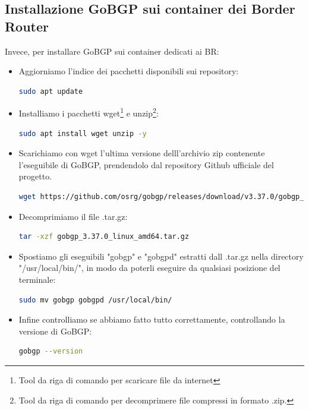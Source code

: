 \documentclass[12pt,a4paper,twoside]{book}
\begin{document}
\subsection{Installazione GoBGP sui container dei Border Router}
Invece, per installare GoBGP sui container dedicati ai \ac{BR}:
\begin{itemize}
    \item Aggiorniamo l'indice dei pacchetti disponibili sui repository:
    \begin{lstlisting}[language=bash]
sudo apt update
    \end{lstlisting}
    \item Installiamo i pacchetti wget\footnote{Tool da riga di comando per scaricare file da internet} e unzip\footnote{Tool da riga di comando per decomprimere file compressi in formato .zip.}:
    \begin{lstlisting}[language=bash]
sudo apt install wget unzip -y
    \end{lstlisting}
    \item Scarichiamo con wget l'ultima versione delll'archivio zip contenente l'eseguibile di GoBGP, prendendolo dal repository Github ufficiale del progetto.
    \begin{lstlisting}[language=bash]
wget https://github.com/osrg/gobgp/releases/download/v3.37.0/gobgp_3.37.0_linux_amd64.tar.gz
    \end{lstlisting}
    \item Decomprimiamo il file .tar.gz:
    \begin{lstlisting}[language=bash]
tar -xzf gobgp_3.37.0_linux_amd64.tar.gz
    \end{lstlisting}
    \item Spostiamo gli eseguibili "gobgp" e "gobgpd" estratti dall .tar.gz nella directory "/usr/local/bin/", in modo da poterli eseguire da qualsiasi posizione del terminale:
     \begin{lstlisting}[language=bash]
sudo mv gobgp gobgpd /usr/local/bin/
    \end{lstlisting}
    \item Infine controlliamo se abbiamo fatto tutto correttamente, controllando la versione di GoBGP:
     \begin{lstlisting}[language=bash]
gobgp --version
    \end{lstlisting}
\end{itemize}
\end{document}
